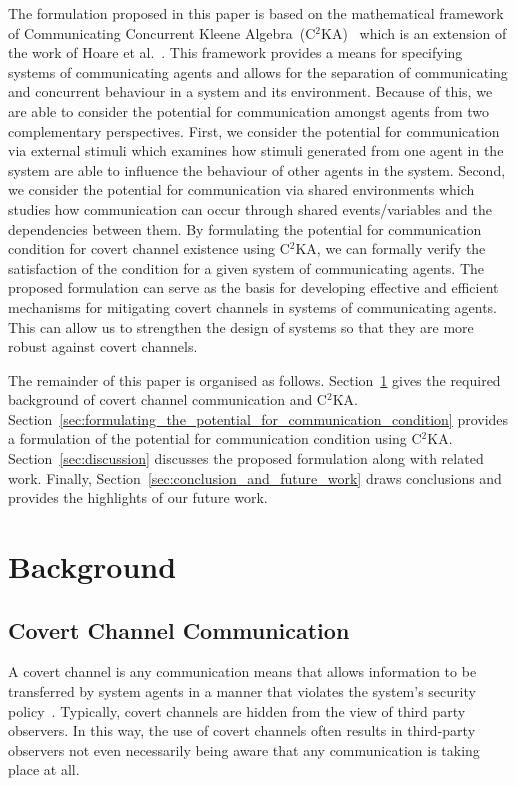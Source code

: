 \documentclass[copyright,creativecommons]{eptcs}
\makeatletter
\newcommand{\etal}{\textrm{et al.}\@\xspace}
\newcommand{\PFC}{potential for communication\@\xspace}
\newcommand{\soca}{system of communicating agents\@\xspace}
\newcommand{\socas}{systems of communicating agents\@\xspace}
\newcommand{\CCKA}{Communicating Concurrent Kleene Algebra\@\xspace}
\newcommand{\CCKAabbrv}{C$^2$KA\@\xspace}
\makeatother
\begin{document}
The formulation proposed in this paper is based on the mathematical framework of \CCKA~(\CCKAabbrv)~\cite{Jaskolka2013aa,Jaskolka2014aa} which is an extension of the work of Hoare \etal~\cite{Hoare2009aa,Hoare2009ab,Hoare2010aa,Hoare2011aa}. This framework provides a means for specifying \socas and allows for the separation of communicating and concurrent behaviour in a system and its environment. Because of this, we are able to consider the potential for communication amongst agents from two complementary perspectives. First, we consider the \PFC via external stimuli which examines how stimuli generated from one agent in the system are able to influence the behaviour of other agents in the system. Second, we consider the \PFC via shared environments which studies how communication can occur through shared events/variables and the dependencies between them. By formulating the \PFC condition for covert channel existence using \CCKAabbrv, we can formally verify the satisfaction of the condition for a given \soca. The proposed formulation can serve as the basis for developing effective and efficient mechanisms for mitigating covert channels in \socas. This can allow us to strengthen the design of systems so that they are more robust against covert channels. 

The remainder of this paper is organised as follows. Section~\ref{sec:background} gives the required background of covert channel communication and \CCKAabbrv. Section~\ref{sec:formulating_the_potential_for_communication_condition} provides a formulation of the \PFC condition using \CCKAabbrv. Section~\ref{sec:discussion} discusses the proposed formulation along with related work. Finally, Section~\ref{sec:conclusion_and_future_work} draws conclusions and provides the highlights of our future work. 

\vspace{-0.1in}
\section{Background} 
\label{sec:background}
\vspace{-0.1in}
\subsection{Covert Channel Communication}
\label{sub:covert_channel_communication}


A covert channel is any communication means that allows information to be transferred by system agents in a manner that violates the system's security policy~\cite{DoD1985aa}. Typically, covert channels are hidden from the view of third party observers. In this way, the use of covert channels often results in third-party observers not even necessarily being aware that any communication is taking place at all.
\end{document}
